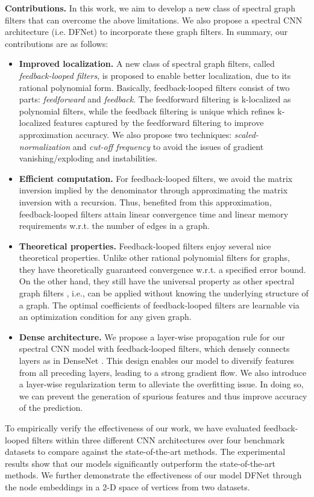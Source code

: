\documentclass{article}
\begin{document}
\smallskip
\noindent\textbf{Contributions. }In this work, we aim to develop a new class of spectral graph filters that can overcome the above limitations. We also propose a spectral CNN architecture (i.e. DFNet) to incorporate these graph filters. In summary, our contributions are as follows: \begin{itemize}
\item \textbf{Improved localization. }A new class of spectral graph filters, called \emph{feedback-looped filters}, is proposed to enable better localization, due to its rational polynomial form. Basically, feedback-looped filters consist of two parts: \emph{feedforward} and \emph{feedback}. The feedforward filtering is k-localized as polynomial filters, while the feedback filtering is unique which refines k-localized features captured by the feedforward filtering to improve approximation accuracy. We also propose two techniques: \emph{scaled-normalization} and \emph{cut-off frequency} to avoid the issues of gradient vanishing/exploding and instabilities. 

\item \textbf{Efficient computation. }For feedback-looped filters, we avoid the matrix inversion implied by the denominator through approximating the matrix inversion with a recursion. Thus, benefited from this approximation, feedback-looped filters attain linear convergence time and linear memory requirements w.r.t. the number of edges in a graph.

\item \textbf{Theoretical properties. }Feedback-looped filters enjoy several nice theoretical properties. Unlike other rational polynomial filters for graphs, they have theoretically guaranteed convergence w.r.t. a specified error bound. On the other hand, they still have the universal property as other spectral graph filters \cite{isufi2017autoregressive1}, i.e., can be applied without knowing the underlying structure of a graph. The optimal coefficients of feedback-looped filters are learnable via an optimization condition for any given graph.

\item \textbf{Dense architecture. }We propose a layer-wise propagation rule for our spectral CNN model with feedback-looped filters, which densely connects layers as in DenseNet \cite{huang2017densely}. This design enables our model to diversify features from all preceding layers, leading to a strong gradient flow. We also introduce a layer-wise regularization term to alleviate the overfitting issue. In doing so, we can prevent the generation of spurious features and thus improve accuracy of the prediction.
\end{itemize}
To empirically verify the effectiveness of our work, we have evaluated feedback-looped filters within three different CNN architectures over four benchmark datasets to compare against the state-of-the-art methods. The experimental results show that our models significantly outperform the state-of-the-art methods. We further demonstrate the effectiveness of our model DFNet through the node embeddings in a 2-D space of vertices from two datasets.
\end{document}
